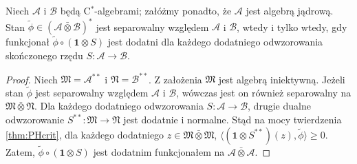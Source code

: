 \begin{Theorem}
Niech $\mathcal{A}$ i $\mathcal{B}$ będą C$^{*}$-algebrami; załóżmy ponadto, że
$\mathcal{A}$ jest algebrą jądrową.
Stan $\tilde{\phi} \in
(\mathcal{A} \bar{\otimes} \mathcal{B})^{*}$ jest separowalny
względem $\mathcal{A}$ i $\mathcal{B}$,
wtedy i tylko wtedy, gdy
funkcjonał $\tilde{\phi} \circ ( \mathbf{1} \otimes S )$
jest dodatni dla każdego dodatniego odwzorowania skończonego rzędu
$S: \mathcal{A} \rightarrow \mathcal{B}$.
\end{Theorem}
\begin{proof}
Niech $\mathfrak{M}=\mathcal{A}^{**}$ i $\mathfrak{N}=\mathcal{B}^{**}$.
Z założenia $\mathfrak{M}$ jest algebrą iniektywną.
Jeżeli stan $\tilde{\phi}$ jest separowalny względem
$\mathcal{A}$ i $\mathcal{B}$, wówczas jest on również separowalny na
$\mathfrak{M} \bar{\otimes} \mathfrak{N}$.
Dla każdego dodatniego odwzorowania
$S: \mathcal{A} \rightarrow \mathcal{B}$, drugie dualne odwzorowanie
$S^{**}:\mathfrak{M} \rightarrow \mathfrak{N}$ jest dodatnie i normalne.
Stąd na mocy twierdzenia \ref{thm:PHcrit}, dla każdego dodatniego
$z \in \mathfrak{M} \bar{\otimes} \mathfrak{M}$,
$\langle (\mathbf{1} \otimes S^{**})(z), \tilde{\phi} \rangle \geq 0$.
Zatem, $\tilde{\phi} \circ (\mathbf{1} \otimes S)$ jest dodatnim funkcjonałem
na $\mathcal{A} \bar{\otimes} \mathcal{A}$.


\end{proof}
